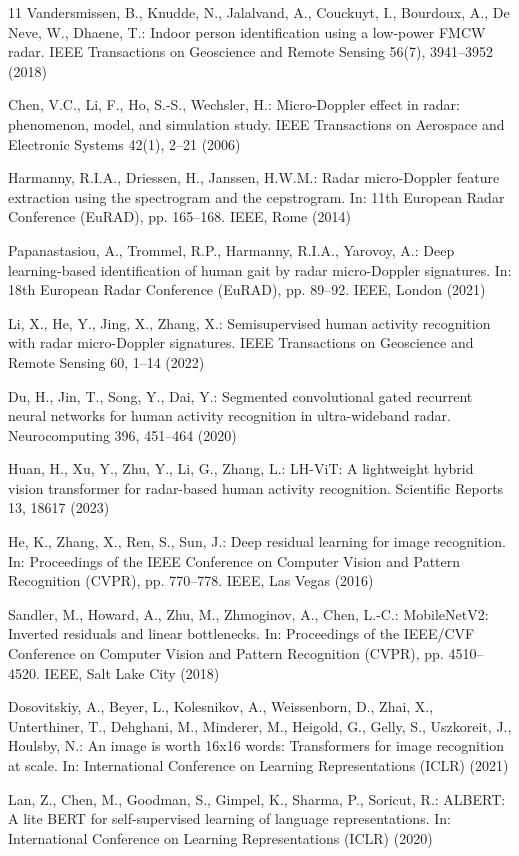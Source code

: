 \documentclass{svproc}
\begin{document}
\begin{thebibliography}{11}
Vandersmissen, B., Knudde, N., Jalalvand, A., Couckuyt, I., Bourdoux, A., De Neve, W., Dhaene, T.: Indoor person identification using a low-power FMCW radar. IEEE Transactions on Geoscience and Remote Sensing 56(7), 3941--3952 (2018)

Chen, V.C., Li, F., Ho, S.-S., Wechsler, H.: Micro-Doppler effect in radar: phenomenon, model, and simulation study. IEEE Transactions on Aerospace and Electronic Systems 42(1), 2--21 (2006)

Harmanny, R.I.A., Driessen, H., Janssen, H.W.M.: Radar micro-Doppler feature extraction using the spectrogram and the cepstrogram. In: 11th European Radar Conference (EuRAD), pp. 165--168. IEEE, Rome (2014)

Papanastasiou, A., Trommel, R.P., Harmanny, R.I.A., Yarovoy, A.: Deep learning-based identification of human gait by radar micro-Doppler signatures. In: 18th European Radar Conference (EuRAD), pp. 89--92. IEEE, London (2021)

Li, X., He, Y., Jing, X., Zhang, X.: Semisupervised human activity recognition with radar micro-Doppler signatures. IEEE Transactions on Geoscience and Remote Sensing 60, 1--14 (2022)

Du, H., Jin, T., Song, Y., Dai, Y.: Segmented convolutional gated recurrent neural networks for human activity recognition in ultra-wideband radar. Neurocomputing 396, 451--464 (2020)

Huan, H., Xu, Y., Zhu, Y., Li, G., Zhang, L.: LH-ViT: A lightweight hybrid vision transformer for radar-based human activity recognition. Scientific Reports 13, 18617 (2023)

He, K., Zhang, X., Ren, S., Sun, J.: Deep residual learning for image recognition. In: Proceedings of the IEEE Conference on Computer Vision and Pattern Recognition (CVPR), pp. 770--778. IEEE, Las Vegas (2016)

Sandler, M., Howard, A., Zhu, M., Zhmoginov, A., Chen, L.-C.: MobileNetV2: Inverted residuals and linear bottlenecks. In: Proceedings of the IEEE/CVF Conference on Computer Vision and Pattern Recognition (CVPR), pp. 4510--4520. IEEE, Salt Lake City (2018)

Dosovitskiy, A., Beyer, L., Kolesnikov, A., Weissenborn, D., Zhai, X., Unterthiner, T., Dehghani, M., Minderer, M., Heigold, G., Gelly, S., Uszkoreit, J., Houlsby, N.: An image is worth 16x16 words: Transformers for image recognition at scale. In: International Conference on Learning Representations (ICLR) (2021)

Lan, Z., Chen, M., Goodman, S., Gimpel, K., Sharma, P., Soricut, R.: ALBERT: A lite BERT for self-supervised learning of language representations. In: International Conference on Learning Representations (ICLR) (2020)
\end{thebibliography}
\end{document}
